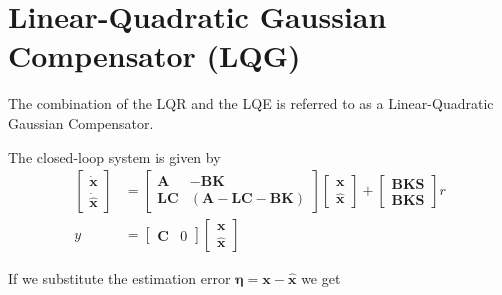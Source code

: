 \section{Linear-Quadratic Gaussian Compensator (LQG)}

The combination of the LQR and the LQE is referred to as a Linear-Quadratic Gaussian Compensator.

\newpar{}

\begin{center}
    
\end{center}

The closed-loop system is given by
\begin{align*}
    \begin{bmatrix}
        \dot{\textbf{x}} \\
        \dot{\hat{\textbf{x}}}
    \end{bmatrix}
      & =
    \begin{bmatrix}
        \mathbf{A}  & - \mathbf{BK}                        \\
        \mathbf{LC} & (\mathbf{A}-\mathbf{LC}-\mathbf{BK})
    \end{bmatrix}
    \begin{bmatrix}
        \textbf{x} \\
        \hat{\textbf{x}}
    \end{bmatrix}
    +
    \begin{bmatrix}
        \mathbf{BKS} \\
        \mathbf{BKS}
    \end{bmatrix}
    r                    \\
    y & = \begin{bmatrix}
              \mathbf{C} & 0
          \end{bmatrix}
    \begin{bmatrix}
        \textbf{x} \\
        \hat{\textbf{x}}
    \end{bmatrix}
\end{align*}

If we substitute the estimation error $\bm{\eta}=\textbf{x}-\hat{\textbf{x}}$ we get

